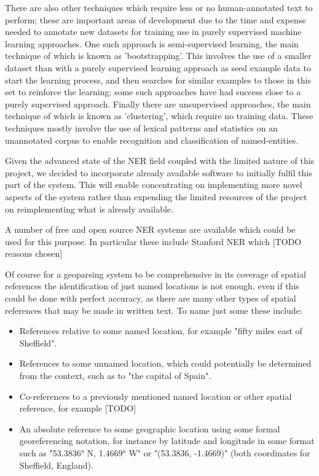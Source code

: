 \documentclass[12pt, a4paper]{report}
\begin{document}
There are also other techniques which require less or no human-annotated text to perform; these are important areas of development due to the time and expense needed to annotate new datasets for training use in purely supervised machine learning approaches. One such approach is semi-supervised learning, the main technique of which is known as 'bootstrapping'. This involves the use of a smaller dataset than with a purely supervised learning approach as seed example data to start the learning process, and then searches for similar examples to those in this set to reinforce the learning; some such approaches have had success close to a purely supervised approach. Finally there are unsupervised approaches, the main technique of which is known as 'clustering', which require no training data. These techniques mostly involve the use of lexical patterns and statistics on an unannotated corpus to enable recognition and classification of named-entities.

Given the advanced state of the NER field coupled with the limited nature of this project, we decided to incorporate already available software to initially fulfil this part of the system. This  will enable concentrating on implementing more novel aspects of the system rather than expending the limited resources of the project on reimplementing what is already available.

A number of free and open source NER systems are available which could be used for this purpose. In particular these include Stanford NER \citep{finkel2005} which [TODO reasons chosen]

Of course for a geoparsing system to be comprehensive in its coverage of spatial references the identification of just named locations is not enough, even if this could be done with perfect accuracy, as there are many other types of spatial references that may be made in written text. To name just some these include:

\begin{itemize}
	\item { References relative to some named location, for example "fifty miles east of Sheffield". }
	\item { References to some unnamed location, which could potentially be determined from the context, such as to "the capital of Spain".}
	\item { Co-references to a previously mentioned named location or other spatial reference, for example [TODO]}
	\item { An absolute reference to some geographic location using some formal georeferencing notation, for instance by latitude and longitude in some format such as "53.3836° N, 1.4669° W" or "(53.3836, -1.4669)" (both coordinates for Sheffield, England). }
\end{itemize}
\end{document}
